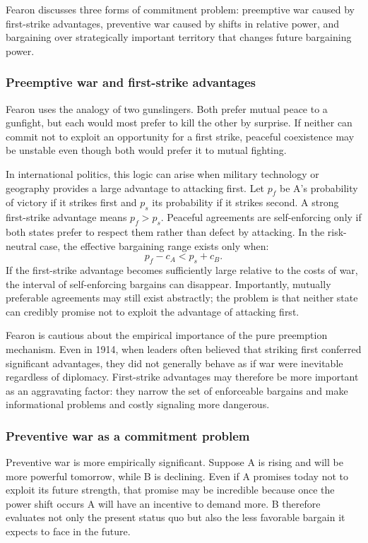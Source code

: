 Fearon discusses three forms of commitment problem: preemptive war caused by first-strike advantages, preventive war caused by shifts in relative power, and bargaining over strategically important territory that changes future bargaining power.

\subsubsection{Preemptive war and first-strike advantages}

Fearon uses the analogy of two gunslingers. Both prefer mutual peace to a gunfight, but each would most prefer to kill the other by surprise. If neither can commit not to exploit an opportunity for a first strike, peaceful coexistence may be unstable even though both would prefer it to mutual fighting.

In international politics, this logic can arise when military technology or geography provides a large advantage to attacking first. Let $p_f$ be A's probability of victory if it strikes first and $p_s$ its probability if it strikes second. A strong first-strike advantage means $p_f>p_s$. Peaceful agreements are self-enforcing only if both states prefer to respect them rather than defect by attacking. In the risk-neutral case, the effective bargaining range exists only when:
\[ p_f-c_A < p_s+c_B.\]
If the first-strike advantage becomes sufficiently large relative to the costs of war, the interval of self-enforcing bargains can disappear. Importantly, mutually preferable agreements may still exist abstractly; the problem is that neither state can credibly promise not to exploit the advantage of attacking first.

Fearon is cautious about the empirical importance of the pure preemption mechanism. Even in 1914, when leaders often believed that striking first conferred significant advantages, they did not generally behave as if war were inevitable regardless of diplomacy. First-strike advantages may therefore be more important as an aggravating factor: they narrow the set of enforceable bargains and make informational problems and costly signaling more dangerous.

\subsubsection{Preventive war as a commitment problem}

Preventive war is more empirically significant. Suppose A is rising and will be more powerful tomorrow, while B is declining. Even if A promises today not to exploit its future strength, that promise may be incredible because once the power shift occurs A will have an incentive to demand more. B therefore evaluates not only the present status quo but also the less favorable bargain it expects to face in the future.

